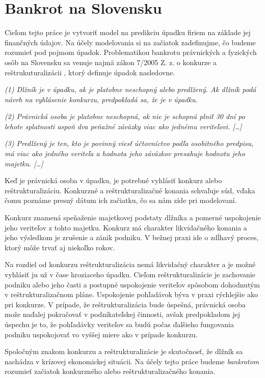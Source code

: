 \section{Bankrot na Slovensku}
\label{bankruptcy}

Cieľom tejto práce je vytvoriť model na predikciu úpadku firiem na základe jej finančných údajov.
Na účely modelovania si na začiatok zadefinujme, čo budeme rozumieť pod pojmom úpadok.
Problematikou bankrotu právnických a fyzických osôb na Slovensku sa venuje najmä zákon 7/2005 Z. z. o konkurze a reštrukuturalizácii \cite{zbierkazakonov},
ktorý definuje úpadok nasledovne.

\bigskip
\textit{(1)
Dlžník je v úpadku, ak je platobne neschopný alebo predlžený. Ak dlžník podá návrh na vyhlásenie konkurzu, predpokladá sa, že je v úpadku.}

\textit{(2)
Právnická osoba je platobne neschopná, ak nie je schopná plniť 30 dní po lehote splatnosti aspoň dva peňažné záväzky viac ako jednému veriteľovi. […]}

\textit{(3)
Predlžený je ten, kto je povinný viesť účtovníctvo podľa osobitného predpisu, má viac ako jedného veriteľa a hodnota jeho záväzkov presahuje hodnotu jeho majetku. […]}
\bigskip

Keď je právnická osoba v úpadku, je potrebné vyhlásiť konkurz alebo reštrukturalizáciu.
Konkurzné a reštrukturalizačné konania schvaľuje súd, vďaka čomu poznáme presný dátum ich začiatku, čo sa nám zíde pri modelovaní.

Konkurz znamená speňaženie majetkovej podstaty dlžníka a pomerné uspokojenie jeho veriteľov z tohto majetku.
Konkurz má charakter likvidačného konania a jeho výsledkom je zrušenie a zánik podniku.
V bežnej praxi ide o zdĺhavý proces, ktorý môže trvať aj niekoľko rokov.

Na rozdiel od konkurzu reštrukturalizácia nemá likvidačný charakter a je možné vyhlásiť ju už v čase hroziaceho úpadku.
Cieľom reštrukturalizácie je zachovanie podniku alebo jeho časti a postupné uspokojenie veriteľov spôsobom dohodnutým v reštrukturalizačnom pláne.
Uspokojenie pohľadávok býva v praxi rýchlejšie ako pri konkurze.
V prípade, že reštrukturalizácia bude úspešná, právnická osoba može naďalej pokračovať v podnikateľskej činnosti,
avšak predpokladom jej úspechu je to, že pohľadávky veriteľov sa budú počas ďalšieho fungovania podniku uspokojovať vo vyššej miere ako v prípade konkurzu.

Spoločným znakom konkurzu a reštrukturalizácie je skutočnosť, že dlžník sa nachádza v krízovej ekonomickej situácii.
Na účely tejto práce budeme \emph{bankrotom} rozumieť začiatok konkurzného alebo reštrukturalizačného konania.

